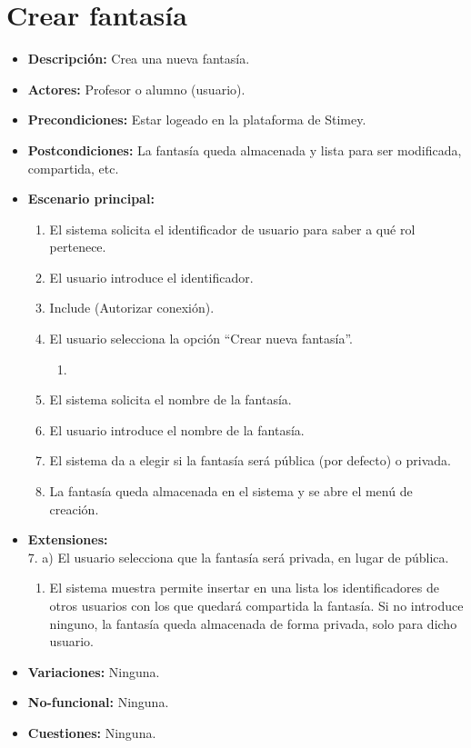 \documentclass[12pt,letterpaper]{article}
\begin{document}
\section{Crear fantasía}
\begin{itemize}
	\item \textbf{Descripción:} Crea una nueva fantasía.
	\item \textbf{Actores:} Profesor o alumno (usuario).
	\item \textbf{Precondiciones:} Estar logeado en la plataforma de Stimey.
	\item \textbf{Postcondiciones:} La fantasía queda almacenada y lista para ser modificada, compartida, etc.
	\item \textbf{Escenario principal:}
	\begin{enumerate}
		\item El sistema solicita el identificador de usuario para saber a qué rol pertenece.
		\item El usuario introduce el identificador.
		\item Include (Autorizar conexión).
		\item El usuario selecciona la opción ``Crear nueva fantasía''.
		\begin{enumerate}
			\item 
		\end{enumerate}
		\item El sistema solicita el nombre de la fantasía.
		\item El usuario introduce el nombre de la fantasía.
		\item El sistema da a elegir si la fantasía será pública (por defecto) o privada.
		\item La fantasía queda almacenada en el sistema y se abre el menú de creación.
	\end{enumerate}
	\item \textbf{Extensiones:} \\7. a) El usuario selecciona que la fantasía será privada, en lugar de pública.
	\begin{enumerate}
		\item El sistema muestra permite insertar en una lista los identificadores de otros usuarios con los que quedará compartida la fantasía. Si no introduce ninguno, la fantasía queda almacenada de forma privada, solo para dicho usuario.
	\end{enumerate}
	\item \textbf{Variaciones:} Ninguna.
	\item \textbf{No-funcional:} Ninguna.
	\item \textbf{Cuestiones:} Ninguna.
\end{itemize}
\end{document}
